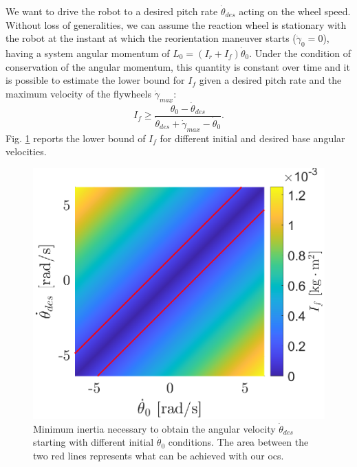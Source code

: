 \documentclass[letterpaper, 10 pt, conference]{ieeeconf}  %
\begin{document}
We want to drive the robot to a desired pitch rate $\dot{\theta}_{des}$ acting on the wheel speed.
Without loss of generalities, we can assume the reaction wheel is stationary with the robot at the instant at which the reorientation maneuver starts ($\dot{\gamma}_0 = 0$), having a system angular momentum of $L_0 = \left(I_r + I_{f}\right)\dot{\theta}_0$.
Under the condition of conservation of the angular momentum, this quantity is constant over time and it is possible to estimate the lower bound for $I_{f}$ given a desired pitch rate and the maximum velocity of the flywheels $\dot{\gamma}_{max}$:
\begin{equation}
I_{f} \geq \dfrac{\dot{\theta}_0-\dot{\theta}_{des}}{\dot{\theta}_{des}+\dot{\gamma}_{max}-\dot{\theta}_0}.
\end{equation}
Fig. \ref{fig:inertia_limits} reports the lower bound of $I_{f}$ for different initial and desired base angular velocities.
\begin{figure}
	\centering
	\includegraphics[width=.7\linewidth]{figures/inertia_limits.eps}
	\caption{\small Minimum inertia necessary to obtain the angular velocity $\dot{\theta}_{des}$ starting with different initial $\dot{\theta}_0$ conditions. The area between the two red lines represents what can be achieved with our \gls{ocs}. }
	\label{fig:inertia_limits}
\end{figure}
\end{document}
